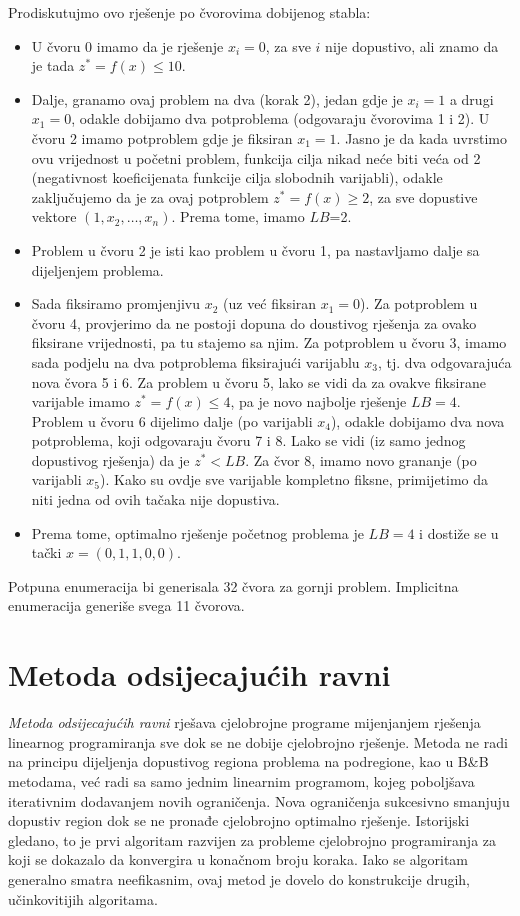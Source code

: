 \documentclass[a4paper, utf8, 11pt, colorlinks]{book}
\begin{document}
Prodiskutujmo ovo rješenje po čvorovima dobijenog stabla:
  \begin{itemize}
      \item U čvoru 0 imamo da je rješenje $x_i = 0$, za sve $i$ nije dopustivo, ali znamo da je tada $z^*=f(x) \leq 10$.
      \item  Dalje, granamo ovaj problem na dva (korak 2), jedan gdje je $x_i=1$ a drugi $x_1=0$, odakle dobijamo dva potproblema (odgovaraju čvorovima 1 i 2). U čvoru 2 imamo potproblem gdje je fiksiran $x_1=1$. Jasno je da kada uvrstimo ovu vrijednost u početni problem, funkcija cilja nikad neće biti veća od 2 (negativnost koeficijenata funkcije cilja slobodnih varijabli), odakle zaključujemo da je za ovaj potproblem $z^*=f(x) \geq 2$, za sve dopustive vektore $(1,x_2,\ldots,x_n)$. Prema tome, imamo $LB$=2. 
      \item Problem u čvoru 2 je isti kao problem u čvoru 1, pa nastavljamo dalje sa dijeljenjem problema. 
      \item Sada fiksiramo promjenjivu $x_2$ (uz već fiksiran $x_1=0$). 
            Za potproblem u čvoru 4, provjerimo da ne postoji dopuna do doustivog rješenja za ovako fiksirane vrijednosti, pa tu stajemo sa njim. Za potproblem u čvoru 3, imamo sada podjelu na dva potproblema fiksirajući varijablu $x_3$, tj. dva odgovarajuća nova čvora 5 i 6. Za problem u čvoru 5, lako se vidi da za ovakve fiksirane varijable imamo 
            $z^*=f(x) \leq 4$, pa je novo najbolje rješenje $LB=4$. Problem u čvoru 6 dijelimo dalje (po varijabli $x_4$), odakle dobijamo dva nova potproblema, koji odgovaraju čvoru 7 i 8. Lako se vidi (iz samo jednog dopustivog rješenja) da je $z^*<LB$.  Za čvor 8, imamo novo grananje (po varijabli $x_5$). Kako su ovdje sve varijable kompletno fiksne, primijetimo da niti jedna od ovih tačaka  nije dopustiva.
            \item Prema tome, optimalno rješenje početnog problema je $LB=4$ i dostiže se u tački $x=(0, 1, 1, 0, 0)$. 
  \end{itemize}
  Potpuna enumeracija bi generisala 32 čvora za gornji problem. Implicitna enumeracija generiše svega 11 čvorova. 
 
\section{Metoda odsijecajućih ravni}
  
\emph{Metoda odsijecajućih ravni} rješava cjelobrojne programe mijenjanjem rješenja linearnog programiranja sve dok se ne dobije cjelobrojno rješenje. Metoda ne radi  na principu dijeljenja dopustivog regiona problema na podregione, kao u B\&B metodama, već radi sa samo jednim linearnim programom, kojeg poboljšava iterativnim dodavanjem novih ograničenja. Nova ograničenja sukcesivno smanjuju dopustiv region dok se ne pronađe cjelobrojno optimalno rješenje.   
 Istorijski gledano, to je prvi algoritam razvijen za probleme cjelobrojno programiranja za koji se dokazalo da konvergira u konačnom broju
koraka. Iako se algoritam generalno smatra   neefikasnim, ovaj metod je dovelo do konstrukcije drugih, učinkovitijih algoritama.  
  
\end{document}
